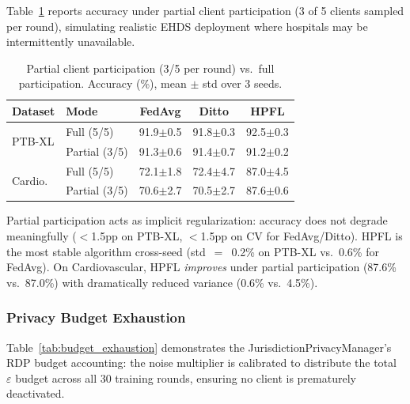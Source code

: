 \documentclass[conference]{IEEEtran}
\begin{document}
Table~\ref{tab:partial_participation} reports accuracy under partial client participation (3 of 5 clients sampled per round), simulating realistic EHDS deployment where hospitals may be intermittently unavailable.

\begin{table}[htbp]
\centering
\caption{Partial client participation (3/5 per round) vs.\ full participation. Accuracy (\%), mean $\pm$ std over 3 seeds.}
\label{tab:partial_participation}
\small
\begin{tabular}{llccc}
\toprule
\textbf{Dataset} & \textbf{Mode} & \textbf{FedAvg} & \textbf{Ditto} & \textbf{HPFL} \\
\midrule
\multirow{2}{*}{PTB-XL} & Full (5/5) & 91.9$\pm$0.5 & 91.8$\pm$0.3 & 92.5$\pm$0.3 \\
 & Partial (3/5) & 91.3$\pm$0.6 & 91.4$\pm$0.7 & 91.2$\pm$0.2 \\
\midrule
\multirow{2}{*}{Cardio.} & Full (5/5) & 72.1$\pm$1.8 & 72.4$\pm$4.7 & 87.0$\pm$4.5 \\
 & Partial (3/5) & 70.6$\pm$2.7 & 70.5$\pm$2.7 & 87.6$\pm$0.6 \\
\bottomrule
\end{tabular}

\vspace{1mm}
\footnotesize{Partial participation acts as implicit regularization: accuracy does not degrade meaningfully ($<$1.5pp on PTB-XL, $<$1.5pp on CV for FedAvg/Ditto). HPFL is the most stable algorithm cross-seed (std~$=$~0.2\% on PTB-XL vs.\ 0.6\% for FedAvg). On Cardiovascular, HPFL \textit{improves} under partial participation (87.6\% vs.\ 87.0\%) with dramatically reduced variance (0.6\% vs.\ 4.5\%).}
\end{table}

\subsubsection{Privacy Budget Exhaustion}
\label{sec:budget_exhaustion}

Table~\ref{tab:budget_exhaustion} demonstrates the JurisdictionPrivacyManager's RDP budget accounting: the noise multiplier is calibrated to distribute the total $\varepsilon$ budget across all 30 training rounds, ensuring no client is prematurely deactivated.
\end{document}
